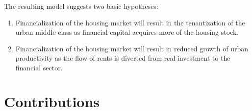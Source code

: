 The resulting model suggests two basic hypotheses:
\begin{enumerate}
    \item Financialization of the housing market will result in the tenantization of the urban middle class as financial capital acquires more of the housing stock. %
    \item Financialization of the housing market will result in reduced growth of urban productivity as the flow of rents is diverted from real investment to the financial sector.
\end{enumerate} 

\section{Contributions}

